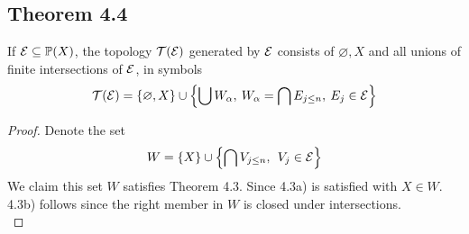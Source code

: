 \documentclass[../../main.tex]{subfiles}
\begin{document}
\subsection{Theorem 4.4}
\begin{wts}
    If $\mathcal{E}\subseteq\mathbb{P}(X)$, the topology $\mathcal{T}(\mathcal{E})$ generated by $\mathcal{E}$ consists of $\varnothing, X$ and all unions of finite intersections of $\mathcal{E}$, in symbols
    \[
    \mathcal{T}(\mathcal{E})=\{\varnothing, X\}\cup\left\{\bigcup W_\alpha,\:W_\alpha = \bigcap E_{j\leq n},\: E_j\in\mathcal{E}\right\}
    \]
\end{wts}
\begin{proof}
    Denote the set
    \[
    W = \{X\}\cup\left\{\bigcap V_{j\leq n},\:\: V_j\in\mathcal{E}\right\}
    \]
    We claim this set $W$ satisfies Theorem 4.3. Since 4.3a) is satisfied with $X\in W$. 4.3b) follows since the right member in $W$ is closed under intersections.\\
    

\end{proof}
\end{document}
